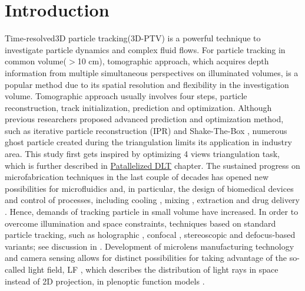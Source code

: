 \documentclass[draftthesis,fullpage]{uiucthesis}
\begin{document}


\chapter{Introduction}\label{chapter:intro}

Time-resolved3D particle tracking(3D-PTV) is a powerful technique to investigate particle dynamics and complex fluid flows. For particle tracking in common volume($>$10 cm), tomographic approach, which acquires depth information from multiple simultaneous perspectives on illuminated volumes, is a popular method due to its spatial resolution and
flexibility in the investigation volume. Tomographic approach usually involves four steps, particle reconstruction, track initialization, prediction and optimization. Although previous researchers proposed advanced prediction and optimization method, such as iterative particle reconstruction (IPR) \citep{wieneke2012iterative} and Shake-The-Box \citep{schanz2016shake}, numerous ghost particle created during the triangulation limits its application in industry area. This study first gets inspired by optimizing 4 views triangulation task, which is further described in \hyperref[chapter:DLT]{Patallelized DLT} chapter.
The sustained progress on microfabrication techniques in the last couple of decades has opened new possibilities for microfluidics and, in particular,  the design of biomedical devices and control of processes, including cooling \citep{singhal2004microscale}, mixing  \citep{song2003millisecond,liu2004two}, extraction \citep{hisamoto2001chip, kluge2009production} and drug delivery \citep{tsai2007review, nguyen2013design}. Hence, demands of tracking particle in small volume have increased. In order to overcome illumination and space constraints, techniques based on standard particle tracking, such as holographic \citep{sheng2006digital, soria2008towards, memmolo2011twin, daloglu2018label}, confocal \citep{kinoshita2007three, lima2008vitro}, stereoscopic \citep{lindken2006stereoscopic, bown2006three} and defocus-based \citep{yoon20063d, pereira2007microscale} variants; see discussion in \citet{wereley2010recent}. Development of microlens manufacturing technology and camera sensing allows for distinct possibilities for taking advantage of the so-called light field, LF \citep{gershun1939light}, which describes the distribution of light rays in space instead of 2D projection, in plenoptic function models  \citep{adelson1991plenoptic}.
\end{document}
